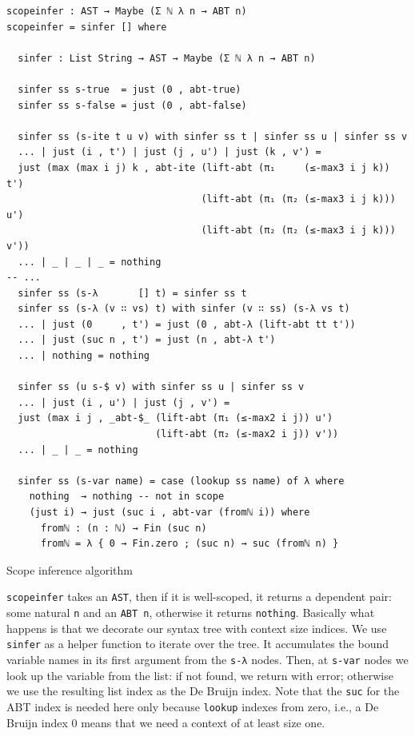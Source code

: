 \begin{listing}[H]
\begin{verbatim}
scopeinfer : AST → Maybe (Σ ℕ λ n → ABT n)
scopeinfer = sinfer [] where

  sinfer : List String → AST → Maybe (Σ ℕ λ n → ABT n)

  sinfer ss s-true  = just (0 , abt-true)
  sinfer ss s-false = just (0 , abt-false)

  sinfer ss (s-ite t u v) with sinfer ss t | sinfer ss u | sinfer ss v
  ... | just (i , t') | just (j , u') | just (k , v') =
  just (max (max i j) k , abt-ite (lift-abt (π₁     (≤-max3 i j k))  t')
                                  (lift-abt (π₁ (π₂ (≤-max3 i j k))) u')
                                  (lift-abt (π₂ (π₂ (≤-max3 i j k))) v'))
  ... | _ | _ | _ = nothing
-- ...
  sinfer ss (s-λ       [] t) = sinfer ss t
  sinfer ss (s-λ (v ∷ vs) t) with sinfer (v ∷ ss) (s-λ vs t)
  ... | just (0     , t') = just (0 , abt-λ (lift-abt tt t'))
  ... | just (suc n , t') = just (n , abt-λ t')
  ... | nothing = nothing

  sinfer ss (u s-$ v) with sinfer ss u | sinfer ss v
  ... | just (i , u') | just (j , v') =
  just (max i j , _abt-$_ (lift-abt (π₁ (≤-max2 i j)) u')
                          (lift-abt (π₂ (≤-max2 i j)) v'))
  ... | _ | _ = nothing

  sinfer ss (s-var name) = case (lookup ss name) of λ where
    nothing  → nothing -- not in scope
    (just i) → just (suc i , abt-var (fromℕ i)) where
      fromℕ : (n : ℕ) → Fin (suc n)
      fromℕ = λ { 0 → Fin.zero ; (suc n) → suc (fromℕ n) }
\end{verbatim}
\caption{Scope inference algorithm}
\label{code:abt-scopeinfer}
\end{listing}

\verb$scopeinfer$ takes an \verb$AST$, then if it is well-scoped, it returns a dependent pair: some natural \verb$n$ and an \verb$ABT n$, otherwise it returns \verb$nothing$. Basically what happens is that we decorate our syntax tree with context size indices. We use \verb$sinfer$ as a helper function to iterate over the tree. It accumulates the bound variable names in its first argument from the \verb$s-λ$ nodes. Then, at \verb$s-var$ nodes we look up the variable from the list: if not found, we return with error; otherwise we use the resulting list index as the De Bruijn index. Note that the \verb$suc$ for the ABT index is needed here only because \verb$lookup$ indexes from zero, i.e., a De Bruijn index 0 means that we need a context of at least size one.

